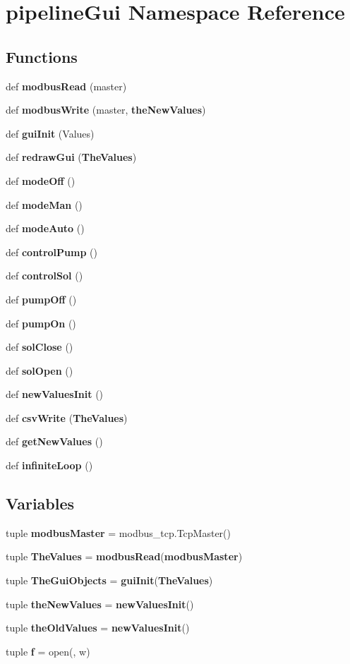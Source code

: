 \section{pipeline\+Gui Namespace Reference}
\label{namespacepipeline_gui}
\subsection*{Functions}
\begin{DoxyCompactItemize}
\item 
def {\bf modbus\+Read} (master)
\item 
def {\bf modbus\+Write} (master, {\bf the\+New\+Values})
\item 
def {\bf gui\+Init} (Values)
\item 
def {\bf redraw\+Gui} ({\bf The\+Values})
\item 
def {\bf mode\+Off} ()
\item 
def {\bf mode\+Man} ()
\item 
def {\bf mode\+Auto} ()
\item 
def {\bf control\+Pump} ()
\item 
def {\bf control\+Sol} ()
\item 
def {\bf pump\+Off} ()
\item 
def {\bf pump\+On} ()
\item 
def {\bf sol\+Close} ()
\item 
def {\bf sol\+Open} ()
\item 
def {\bf new\+Values\+Init} ()
\item 
def {\bf csv\+Write} ({\bf The\+Values})
\item 
def {\bf get\+New\+Values} ()
\item 
def {\bf infinite\+Loop} ()
\end{DoxyCompactItemize}
\subsection*{Variables}
\begin{DoxyCompactItemize}
\item 
tuple {\bf modbus\+Master} = modbus\+\_\+tcp.\+Tcp\+Master()
\item 
tuple {\bf The\+Values} = {\bf modbus\+Read}({\bf modbus\+Master})
\item 
tuple {\bf The\+Gui\+Objects} = {\bf gui\+Init}({\bf The\+Values})
\item 
tuple {\bf the\+New\+Values} = {\bf new\+Values\+Init}()
\item 
tuple {\bf the\+Old\+Values} = {\bf new\+Values\+Init}()
\item 
tuple {\bf f} = open(\textquotesingle{}, \textquotesingle{}w\textquotesingle{})
\end{DoxyCompactItemize}


